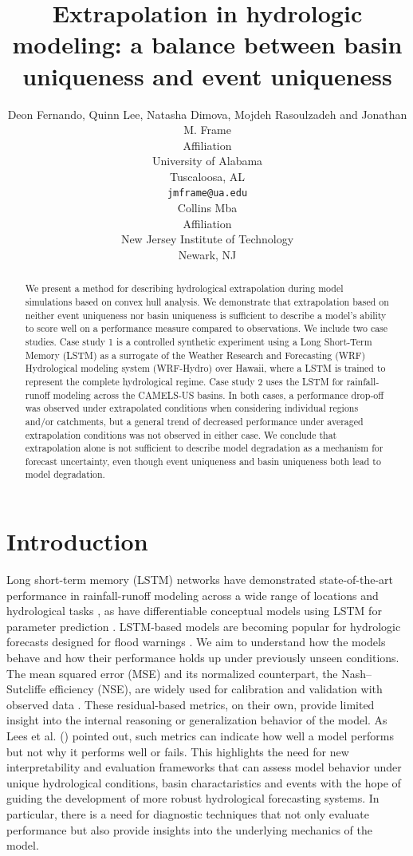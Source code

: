 \documentclass{article}
\title{Extrapolation in hydrologic modeling: a balance between basin uniqueness and event uniqueness
}
\author{
  Deon Fernando, Quinn Lee, Natasha Dimova, Mojdeh Rasoulzadeh and Jonathan M. Frame  \\
  Affiliation \\
  University of Alabama \\
  Tuscaloosa, AL\\
  \texttt{jmframe@ua.edu} \\
   \And
  Collins Mba \\
  Affiliation \\
  New Jersey Institute of Technology \\
  Newark, NJ\\
}
\begin{document}
\maketitle


\begin{abstract}
We present a method for describing hydrological extrapolation during model simulations based on convex hull analysis. We demonstrate that extrapolation based on neither event uniqueness nor basin uniqueness is sufficient to describe a model's ability to score well on a performance measure compared to observations. We include two case studies. Case study 1 is a controlled synthetic experiment using a Long Short-Term Memory (LSTM) as a surrogate of the Weather Research and Forecasting (WRF) Hydrological modeling system (WRF-Hydro) over Hawaii, where a LSTM is trained to represent the complete hydrological regime. Case study 2 uses the LSTM for rainfall-runoff modeling across the CAMELS-US basins. In both cases, a performance drop-off was observed under extrapolated conditions when considering individual regions and/or catchments, but a general trend of decreased performance under averaged extrapolation conditions was not observed in either case. We conclude that extrapolation alone is not sufficient to describe model degradation as a mechanism for forecast uncertainty, even though event uniqueness and basin uniqueness both lead to model degradation. 
\end{abstract}




\section{Introduction}
Long short-term memory (LSTM) networks have demonstrated state-of-the-art performance in rainfall-runoff modeling across a wide range of locations and hydrological tasks \cite{Kratzert2018lstm, Fang2017smap, Feng2020}, as have differentiable conceptual models using LSTM for parameter prediction \cite{feng2022differentiable, Feng2022, Shen2023}. LSTM-based models are becoming popular for hydrologic forecasts designed for flood warnings \cite{Nearing2024}.  We aim to understand how the models behave and how their performance holds up under previously unseen conditions. The mean squared error (MSE) and its normalized counterpart, the Nash–Sutcliffe efficiency (NSE), are widely used for calibration and validation with observed data \cite{Gupta2009}. These residual-based metrics, on their own, provide limited insight into the internal reasoning or generalization behavior of the model. As Lees et al. (\cite{Lees2021}) pointed out, such metrics can indicate how well a model performs but not why it performs well or fails. This highlights the need for new interpretability and evaluation frameworks that can assess model behavior under unique hydrological conditions, basin charactaristics and events with the hope of guiding the development of more robust hydrological forecasting systems. In particular, there is a need for diagnostic techniques that not only evaluate performance but also provide insights into the underlying mechanics of the model.
\end{document}

